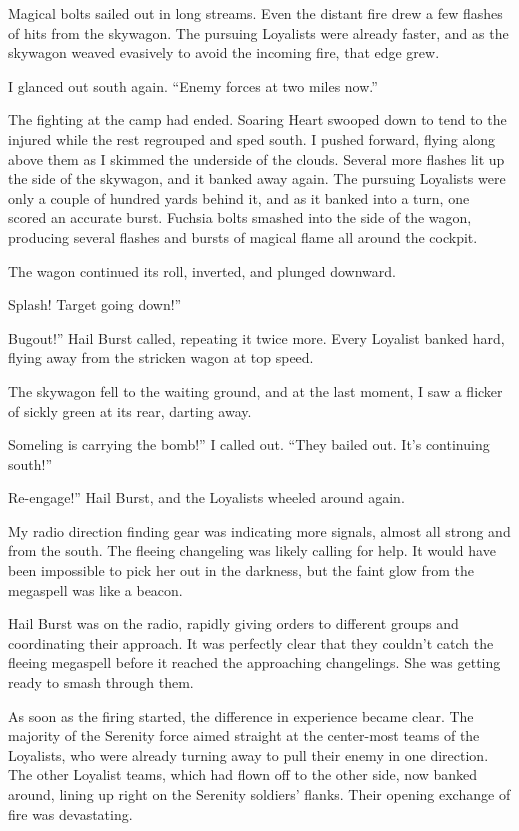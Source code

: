 Magical bolts sailed out in long streams. Even the distant fire drew a few flashes of hits from the skywagon. The pursuing Loyalists were already faster, and as the skywagon weaved evasively to avoid the incoming fire, that edge grew.

I glanced out south again. “Enemy forces at two miles now.”

The fighting at the camp had ended. Soaring Heart swooped down to tend to the injured while the rest regrouped and sped south. I pushed forward, flying along above them as I skimmed the underside of the clouds. Several more flashes lit up the side of the skywagon, and it banked away again. The pursuing Loyalists were only a couple of hundred yards behind it, and as it banked into a turn, one scored an accurate burst. Fuchsia bolts smashed into the side of the wagon, producing several flashes and bursts of magical flame all around the cockpit.

The wagon continued its roll, inverted, and plunged downward.

\leavevmode{}Splash! Target going down!”

\leavevmode{}Bugout!” Hail Burst called, repeating it twice more. Every Loyalist banked hard, flying away from the stricken wagon at top speed.

The skywagon fell to the waiting ground, and at the last moment, I saw a flicker of sickly green at its rear, darting away.

\leavevmode{}Someling is carrying the bomb!” I called out. “They bailed out. It’s continuing south!”

\leavevmode{}Re-engage!” Hail Burst, and the Loyalists wheeled around again.

My radio direction finding gear was indicating more signals, almost all strong and from the south. The fleeing changeling was likely calling for help. It would have been impossible to pick her out in the darkness, but the faint glow from the megaspell was like a beacon.

Hail Burst was on the radio, rapidly giving orders to different groups and coordinating their approach. It was perfectly clear that they couldn’t catch the fleeing megaspell before it reached the approaching changelings. She was getting ready to smash through them.

As soon as the firing started, the difference in experience became clear. The majority of the Serenity force aimed straight at the center-most teams of the Loyalists, who were already turning away to pull their enemy in one direction. The other Loyalist teams, which had flown off to the other side, now banked around, lining up right on the Serenity soldiers’ flanks. Their opening exchange of fire was devastating.

